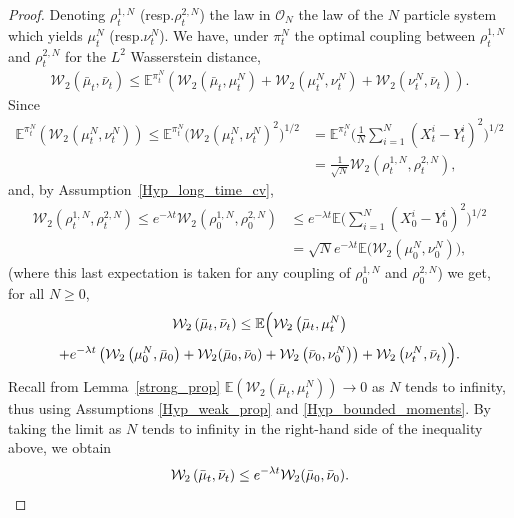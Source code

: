 \documentclass[11pt]{article}
\newcommand{\resp}{resp.\xspace}
\theoremstyle{plain}
\theoremstyle{definition}
\begin{document}
\begin{proof}
Denoting $\rho^{1,N}_t$ (\resp $\rho^{2,N}_t$) the law in $\mathcal{O}_N$ the law of the $N$ particle system which yields $\mu_t^N$ (\resp $\nu_t^N$). We have, under $\pi^N_t$ the optimal coupling between $\rho^{1,N}_t$ and $\rho^{2,N}_t$ for the $L^2$ Wasserstein distance,
\begin{align*}
\mathcal{W}_2\left(\bar{\mu}_t, \bar{\nu}_t\right)\leq\mathbb{E}^{\pi^N_t}\left(\mathcal{W}_2\left(\bar{\mu}_t, \mu^N_t\right)+\mathcal{W}_2\left(\mu^N_t, \nu^N_t\right)+\mathcal{W}_2\left(\nu^N_t, \bar{\nu}_t\right)\right).
\end{align*}
Since
\begin{align*}
\mathbb{E}^{\pi^N_t}\left(\mathcal{W}_2\left(\mu^N_t, \nu^N_t\right)\right)\leq
\mathbb{E}^{\pi^N_t}\bigl(\mathcal{W}_2\left(\mu^N_t, \nu^N_t\right)^2\bigr)^{1/2}&=\mathbb{E}^{\pi^N_t}\biggl(\frac{1}{N}\sum_{i=1}^N(X^i_t-Y^i_t)^2\biggr)^{1/2}\\
&=\frac{1}{\sqrt{N}}\mathcal{W}_2(\rho^{1,N}_t,\rho^{2,N}_t),
\end{align*}
and, by Assumption~\ref{Hyp_long_time_cv},
\begin{align*}
\mathcal{W}_2(\rho^{1,N}_t,\rho^{2,N}_t)\leq e^{-\lambda t}\mathcal{W}_2(\rho^{1,N}_0,\rho^{2,N}_0)&\leq e^{-\lambda t}\mathbb{E}\biggl(\sum_{i=1}^N(X^i_0-Y^i_0)^2\biggr)^{1/2}\\
&=\sqrt{N}e^{-\lambda t}\mathbb{E}\bigl(\mathcal{W}_2\left(\mu^N_0, \nu^N_0\right)\bigr),
\end{align*}
(where this last expectation is taken for any coupling of $\rho^{1,N}_0$ and $\rho^{2,N}_0$) we get, for all $N\geq0$,
\begin{multline*}
\mathcal{W}_2\left(\bar{\mu}_t, \bar{\nu}_t\right)
\leq \mathbb{E}\Bigl(\mathcal{W}_2\left(\bar{\mu}_t, \mu^N_t\right)\\+e^{-\lambda t}\left(\mathcal{W}_2\left(\mu^N_0, \bar{\mu}_0\right)+\mathcal{W}_2(\bar{\mu}_0, \bar{\nu}_0)
+\mathcal{W}_2\left(\bar{\nu}_0, \nu^N_0\right)\right)
+\mathcal{W}_2\left(\nu^N_t, \bar{\nu}_t\right)\Bigr).
\end{multline*}
Recall from Lemma~\ref{strong_prop} ${\mathbb{E}\left(\mathcal{W}_2\left(\bar{\mu}_t, \mu^N_t\right)\right)\to0}$ as $N$ tends to infinity, thus using Assumptions \ref{Hyp_weak_prop} and \ref{Hyp_bounded_moments}. By taking the limit as $N$ tends to infinity in the right-hand side of the inequality above, we obtain
\[
\mathcal{W}_2\left(\bar{\mu}_t, \bar{\nu}_t\right)\leq e^{-\lambda t}\mathcal{W}_2(\bar{\mu}_0, \bar{\nu}_0).\qedhere
\]
\end{proof}
\end{document}
